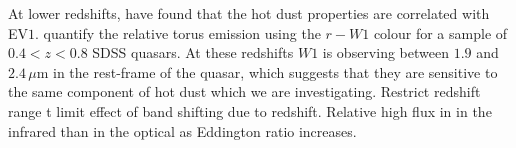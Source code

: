 At lower redshifts, \citet{shen14} have found that the hot dust properties are correlated with EV$1$. 
\citet{shen14} quantify the relative torus emission using the $r-W1$ colour for a sample of $0.4 < z < 0.8$ SDSS quasars. 
At these redshifts $W1$ is observing between $1.9$ and $2.4$\,$\mu$m in the rest-frame of the quasar, which suggests that they are sensitive to the same component of hot dust which we are investigating. 
Restrict redshift range t limit effect of band shifting due to redshift. 
Relative high flux in in the infrared than in the optical as Eddington ratio increases. 

